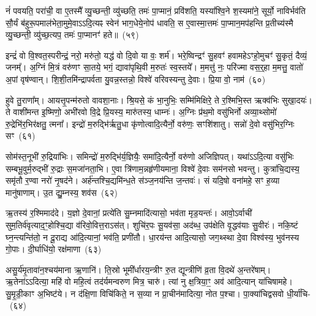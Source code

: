नं॑ पवयति॒ परा॑ची॒ वा ए॒तस्मै᳚ व्यु॒च्छन्ती॒ व्यु॑च्छति॒ तमः॑ पा॒प्मानं॒ प्रवि॑शति॒ यस्या᳚श्वि॒ने श॒स्यमा॑ने॒ सूर्यो॒ नाविर्भव॑ति सौ॒र्यं ब॑हुरू॒पमाल॑भेता॒मुमे॒वा\-ऽऽ\-दि॒त्यꣴ स्वेन॑ भाग॒धेये॒नोप॑ धावति॒ स ए॒वास्मा॒त्तमः॑ पा॒प्मान॒मप॑हन्ति प्र॒तीच्य॑स्मै व्यु॒च्छन्ती॒ व्यु॑च्छ॒त्यप॒ तमः॑ पा॒प्मानꣳ॑ हते॥~(५९)\ip

{\anuvakamend[{ल॒लामः॒ स ए॒व षट्च॑त्वारिꣳशच्च}]}%

इन्द्रं॑ वो वि॒श्वत॒स्परीन्द्रं॒ नरो॒ मरु॑तो॒ यद्ध॑ वो दि॒वो या वः॒ शर्म॑। भरे॒ष्विन्द्रꣳ॑ सु॒हवꣳ॑ हवामहे\-ऽꣳहो॒मुचꣳ॑ सु॒कृतं॒ दैव्यं॒ जनम्᳚। अ॒ग्निं मि॒त्रं वरु॑णꣳ सा॒तये॒ भगं॒ द्यावा॑\-पृथि॒वी म॒रुतः॑ स्व॒स्तये᳚। म॒मत्तु॑ नः॒ परि॑ज्मा वस॒र्॒\mbox{}हा म॒मत्तु॒ वातो॑ अ॒पां वृष॑ण्वान्। शि॒शी॒तमि॑न्द्रापर्वता यु॒वन्न॒स्तन्नो॒ विश्वे॑ वरिवस्यन्तु दे॒वाः। प्रि॒या वो॒ नाम॑~(६०)\ip

हुवे तु॒राणा᳚म्। आयत्तृ॒पन्म॑रुतो वावशा॒नाः। श्रि॒यसे॒ कं भा॒नुभिः॒ सम्मि॑मिक्षिरे॒ ते र॒श्मिभि॒स्त ऋक्व॑भिः सुखा॒दयः॑। ते वाशी॑मन्त इ॒ष्मिणो॒ अभी॑रवो वि॒द्रे प्रि॒यस्य॒ मारु॑तस्य॒ धाम्नः॑। अ॒ग्निः प्र॑थ॒मो वसु॑भिर्नो अव्या॒थ्सोमो॑ रु॒द्रेभि॑र॒भिर॑क्षतु॒ त्मना᳚। इन्द्रो॑ म॒रुद्भि॑र्\mbox{}ऋतु॒धा कृ॑णोत्वादि॒त्यैर्नो॒ वरु॑णः॒ सꣳशि॑शातु। सन्नो॑ दे॒वो वसु॑भिर॒ग्निः सꣳ~(६१)\ip

सोम॑स्त॒नूभी॑ रु॒द्रिया॑भिः। समिन्द्रो॑ म॒रुद्भि॑र्य॒ज्ञियैः॒ समा॑दि॒त्यैर्नो॒ वरु॑णो अजिज्ञिपत्। यथा॑\-ऽऽ\-दि॒त्या वसु॑भिः सम्बभू॒वुर्म॒रुद्भी॑ रु॒द्राः स॒मजा॑नता॒भि। ए॒वा त्रि॑णाम॒न्नहृ॑णीयमाना॒ विश्वे॑ दे॒वाः सम॑नसो भवन्तु। कुत्रा॑चि॒द्यस्य॒ समृ॑तौ र॒ण्वा नरो॑ नृ॒षद॑ने। अर्\mbox{}ह॑न्तश्चि॒द्यमि॑न्ध॒ते स॑ञ्ज॒नय॑न्ति ज॒न्तवः॑। सं यदि॒षो वना॑महे॒ सꣳ ह॒व्या मानु॑षाणाम्। उ॒त द्यु॒म्नस्य॒ शव॑स~(६२)\ip

ऋ॒तस्य॑ र॒श्मिमाद॑दे। य॒ज्ञो दे॒वानां॒ प्रत्ये॑ति सु॒म्नमादि॑त्यासो॒ भव॑ता मृड॒यन्तः॑। आवो॒\-ऽर्वाची॑ सुम॒तिर्व॑वृत्या\-द॒ꣳ॒होश्चि॒द्या व॑रिवो॒वित्त॒रा\-ऽस॑त्। शुचि॑र॒पः सू॒यव॑सा॒ अद॑ब्ध॒ उप॑क्षेति वृ॒द्धव॑याः सु॒वीरः॑। नकि॒ष्टं घ्न॒न्त्यन्ति॑तो॒ न दू॒राद्य आ॑दि॒त्यानां॒ भव॑ति॒ प्रणी॑तौ। धा॒रय॑न्त आदि॒त्यासो॒ जग॒थ्स्था दे॒वा विश्व॑स्य॒ भुव॑नस्य गो॒पाः। दी॒र्घाधि॑यो॒ रक्ष॑माणा~(६३)\ip

असु॒र्य॑मृ॒तावा॑न॒श्चय॑माना ऋ॒णानि॑। ति॒स्रो भूमी᳚र्धारय॒न्त्रीꣳ रु॒त द्यून्त्रीणि॑ व्र॒ता वि॒दथे॑ अ॒न्तरे॑षाम्। ऋ॒तेना॑\-ऽऽ\-दित्या॒ महि॑ वो महि॒त्वं तद॑र्यमन्वरुण मित्र॒ चारु॑। त्यां नु क्ष॒त्रिया॒ꣳ॒ अव॑ आदि॒त्यान् या॑चिषामहे। सु॒मृ॒डी॒काꣳ अ॒भिष्ट॑ये। न द॑क्षि॒णा विचि॑किते॒ न स॒व्या न प्रा॒चीन॑मादित्या॒ नोत प॒श्चा। पा॒क्या॑चिद्वसवो धी॒र्या॑चि-~(६४)\ip

